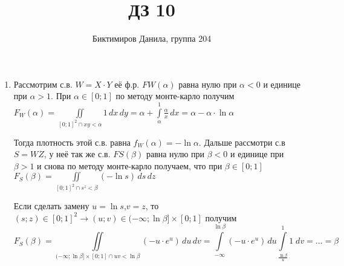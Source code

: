 \documentclass[11pt]{article}
\begin{document}
	
	\author{Биктимиров Данила, группа 204}
	\title{ДЗ 10}
	\date{}
	\maketitle
	
	\medskip
	
	\begin{enumerate}
		
		\item Рассмотрим с.в. $W=X⋅Y$  её ф.р. $FW(\alpha)$ равна нулю при $\alpha<0$ и единице при $\alpha>1$. При $\alpha \in [0;1]$ по методу монте-карло получим $F_{W}(\alpha)=\iint\limits_{[0;1]^2 \cap xy < \alpha}1\,dx\,dy = \alpha+\int\limits_{\alpha}^{1}\frac{\alpha}{x}\,dx = \alpha - \alpha\cdot\ln \alpha$
		
		Тогда плотность этой с.в. равна $f_{W}(\alpha)=-\ln \alpha$. Дальше рассмотри с.в $S=WZ$, у неё так же с.в. $FS(\beta)$ равна нулю при $\beta<0$ и единице при $\beta>1$ и снова по методу монте-карло получаем, что при $\beta\in [0;1]$
		$F_{S}(\beta)=\iint\limits_{[0;1]^2 \cap s^z < \beta}(-\ln s)\,ds\, dz$
		
		Если сделать замену $u=\ln s$,$v=z$, то $(s;z)\in [0;1]^2\to (u;v)\in (−\infty;\ln\beta]×[0;1]$ получим
		$$F_{S}(\beta)=\iint\limits_{(-\infty;\ln\beta]\times [0;1] \cap uv < \ln\beta}(-u\cdot e^u)\,du\, dv =\int\limits_{-\infty}^{\ln\beta}(-u\cdot e^u)\,du \int\limits_{\frac{\ln\beta}{u}}^{1} 1\;dv = \ldots = \beta$$
	\end{enumerate}
\end{document}
